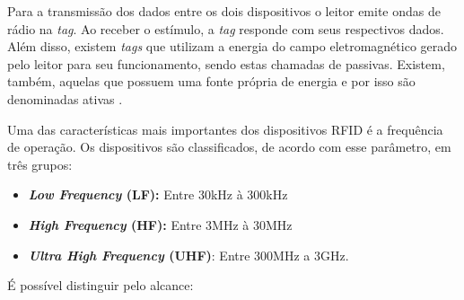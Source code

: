 Para a transmissão dos dados entre os dois dispositivos o leitor emite ondas de rádio na \textit{tag}. Ao receber o estímulo, a \textit{tag} responde com seus respectivos dados. Além disso, existem \textit{tags} que utilizam a energia do campo eletromagnético gerado pelo leitor para seu funcionamento, sendo estas chamadas de passivas. Existem, também, aquelas que possuem uma fonte própria de energia e por isso são denominadas ativas \cite{Finkenzeller2010}.







Uma das características mais importantes dos dispositivos RFID é a frequência de operação.
Os dispositivos são classificados, de acordo com esse parâmetro, em três grupos:

\begin{itemize} \parskip -3pt
	\item \textbf{\textit{Low Frequency} (LF):} Entre 30kHz à 300kHz
	\item \textbf{\textit{High Frequency} (HF):} Entre 3MHz à 30MHz
	\item \textbf{\textit{Ultra High Frequency} (UHF)}: Entre 300MHz a 3GHz.
\end{itemize}

É possível distinguir pelo alcance:

